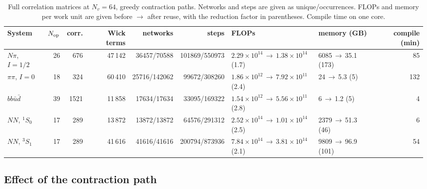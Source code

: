 \documentclass[a4paper,fleqn]{cas-dc}
\begin{document}
\begin{table}[t]
\centering
\caption{Full correlation matrices at \(N_v=64\), greedy contraction paths. Networks and
steps are given as unique/occurrences. FLOPs and memory per work unit are given
before \(\to\) after reuse, with the reduction factor in parentheses. Compile time
on one core.}
\label{tab:reuse_full}
\footnotesize
\setlength{\tabcolsep}{3pt}
\begin{tabular}{@{}lrrrrrllr@{}}
\toprule
System & \(N_{\rm op}\) & corr. & Wick terms & networks & steps & FLOPs & memory (GB) & compile (min)\\
\midrule
$N\pi$, $I=1/2$ & 26 & 676 & 47\,142 & 36457/70588 & 101869/550973 & \(2.29\times10^{14}\)\,\(\to\)\,\(1.38\times10^{14}\) (1.7) & 6085\,\(\to\)\,35.1 (173) & 85 \\
$\pi\pi$, $I=0$ & 18 & 324 & 60\,410 & 25716/142062 & 99672/308260 & \(1.86\times10^{12}\)\,\(\to\)\,\(7.92\times10^{11}\) (2.4) & 24\,\(\to\)\,5.3 (5) & 132 \\
$bb\bar u\bar d$ & 39 & 1521 & 11\,858 & 17634/17634 & 33095/169322 & \(1.54\times10^{12}\)\,\(\to\)\,\(5.56\times10^{11}\) (2.8) & 6\,\(\to\)\,1.2 (5) & 4 \\
$NN$, $^1S_0$ & 17 & 289 & 13\,872 & 13872/13872 & 64576/291312 & \(2.52\times10^{14}\)\,\(\to\)\,\(1.01\times10^{14}\) (2.5) & 2379\,\(\to\)\,51.3 (46) & 6 \\
$NN$, $^3S_1$ & 17 & 289 & 41\,616 & 41616/41616 & 200794/873936 & \(7.84\times10^{14}\)\,\(\to\)\,\(3.81\times10^{14}\) (2.1) & 9809\,\(\to\)\,96.9 (101) & 54 \\
\bottomrule
\end{tabular}
\end{table}

\FloatBarrier

\subsection{Effect of the contraction path}
\label{sec:perf_paths}
\end{document}
